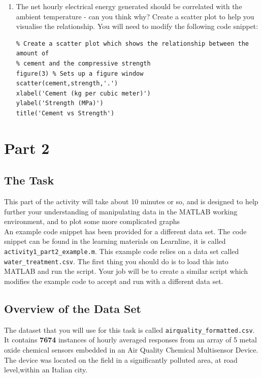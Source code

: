 \documentclass[12pt]{article}
\begin{document}
\begin{enumerate}
\item The net hourly electrical energy generated should be correlated with the ambient temperature - can you think why? Create a scatter plot to help you visualise the relationship. You will need to modify the following code snippet:
\vspace{-0.4cm}
\begin{lstlisting}
% Create a scatter plot which shows the relationship between the amount of
% cement and the compressive strength 
figure(3) % Sets up a figure window
scatter(cement,strength,'.')
xlabel('Cement (kg per cubic meter)')
ylabel('Strength (MPa)')
title('Cement vs Strength')
\end{lstlisting}
\end{enumerate}

\newpage

\section*{Part 2}
\subsection*{The Task}
This part of the activity will take about 10 minutes or so, and is designed to help further your understanding of manipulating data in the MATLAB working environment, and to plot some more complicated graphs\\

An example code snippet has been provided for a different data set. The code snippet can be found in the learning materials on Learnline, it is called \verb|activity1_part2_example.m|. This example code relies on a data set called \verb|water_treatment.csv|. The first thing you should do is to load this into MATLAB and run the script. Your job will be to create a similar script which modifies the example code to accept and run with a different data set.

\subsection*{Overview of the Data Set}
The dataset that you will use for this task is called \verb|airquality_formatted.csv|. It contains \textbf{7674} instances of hourly averaged responses from an array of 5 metal oxide chemical sensors embedded in an Air Quality Chemical Multisensor Device. The device was located on the field in a significantly polluted area, at road level,within an Italian city.\\
\end{document}
